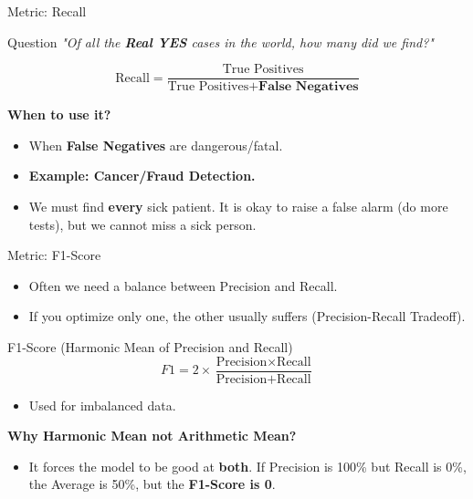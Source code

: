 \begin{frame}{Metric: Recall}
    
    \begin{block}{Question}
        \textit{"Of all the \textbf{Real YES} cases in the world, how many did we find?"}
    \end{block}

    \vspace{1em}
    
    \[
        \text{Recall} = \frac{\text{True Positives}}{\text{True Positives} + \textbf{False Negatives}}
    \]
    
    \vspace{1.5em}
    
    \textbf{When to use it?}
    \begin{itemize}
        \item When \textbf{False Negatives} are dangerous/fatal.
        \item \textbf{Example: Cancer/Fraud Detection.} 
        \item We must find \textbf{every} sick patient. It is okay to raise a false alarm (do more tests), but we cannot miss a sick person.
    \end{itemize}

\end{frame}

\begin{frame}{Metric: F1-Score}

    \begin{itemize}
        \item Often we need a balance between Precision and Recall.
        \item If you optimize only one, the other usually suffers (Precision-Recall Tradeoff).
    \end{itemize}

    \vspace{1em}
    
    \begin{block}{F1-Score (Harmonic Mean of Precision and Recall)}
        \[
            F1 = 2 \times \frac{\text{Precision} \times \text{Recall}}{\text{Precision} + \text{Recall}}
        \]
    \end{block}
    
    \begin{itemize}
        \item Used for imbalanced data.
    \end{itemize}
    
    \textbf{Why Harmonic Mean not Arithmetic Mean?}
    \begin{itemize}
        \item It forces the model to be good at \textbf{both}. If Precision is 100\% but Recall is 0\%, the Average is 50\%, but the \textbf{F1-Score is 0}.
    \end{itemize}

\end{frame}

